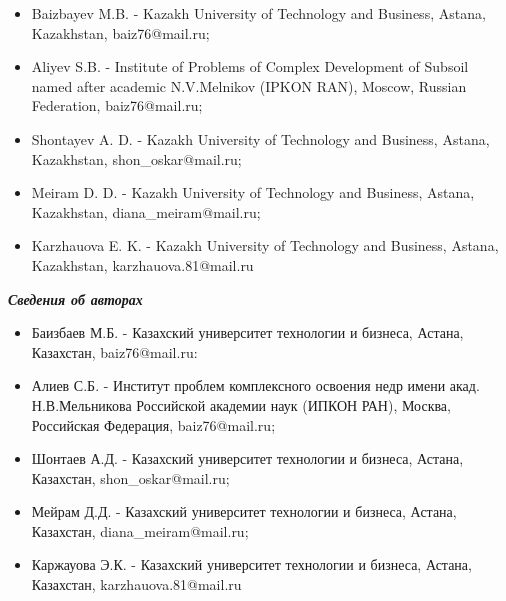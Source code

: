 \begin{itemize}
\item
Baizbayev M.B. - Kazakh University of Technology and Business, Astana,
Kazakhstan, baiz76@mail.ru;

\item
Aliyev S.B. - Institute of Problems of Complex Development of Subsoil
named after academic N.V.Melnikov (IPKON RAN), Moscow, Russian
Federation, baiz76@mail.ru;

\item
Shontayev A. D. - Kazakh University of Technology and Business, Astana,
Kazakhstan,
shon\_oskar@mail.ru;

\item
Meiram D. D. - Kazakh University of Technology and Business, Astana,
Kazakhstan,
diana\_meiram@mail.ru;

\item
Karzhauova E. K. - Kazakh University of Technology and Business, Astana,
Kazakhstan,
karzhauova.81@mail.ru
\end{itemize}

\emph{{\bfseries Сведения об авторах}}

\begin{itemize}
\item
Баизбаев М.Б. - Казахский университет технологии и бизнеса, Астана,
Казахстан, baiz76@mail.ru:

\item
Алиев С.Б. - Институт проблем комплексного освоения недр имени акад.
Н.В.Мельникова Российской академии наук (ИПКОН РАН), Москва, Российская
Федерация, baiz76@mail.ru;

\item
Шонтаев А.Д. - Казахский университет технологии и бизнеса, Астана,
Казахстан,
shon\_oskar@mail.ru;

\item
Мейрам Д.Д. - Казахский университет технологии и бизнеса, Астана,
Казахстан,
diana\_meiram@mail.ru;

\item
Каржауова Э.К. - Казахский университет технологии и бизнеса, Астана,
Казахстан,
karzhauova.81@mail.ru
\end{itemize}
